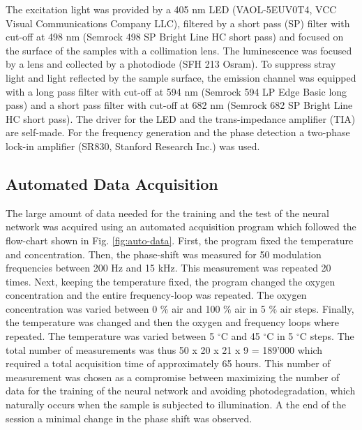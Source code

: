 \documentclass[9pt,twocolumn,twoside,pdftex]{optica}
\begin{document}
The excitation light was provided by a 405 nm LED (VAOL-5EUV0T4, VCC Visual Communications Company LLC), filtered by a short pass (SP) filter with cut-off at 498 nm (Semrock 498 SP Bright Line HC short pass) and focused on the surface of the samples with a collimation lens. The luminescence was focused by a lens and collected by a photodiode (SFH 213 Osram).
To suppress stray light and light reflected by the sample surface, the emission channel was equipped with a long pass filter with cut-off at 594 nm (Semrock 594 LP Edge Basic long pass) and a short pass filter with cut-off at 682 nm (Semrock 682 SP Bright Line HC short pass). The driver for the LED and the trans-impedance amplifier (TIA) are self-made.
For the frequency generation and the phase detection a two-phase lock-in amplifier (SR830, Stanford Research Inc.) was used. 

\subsection{Automated Data Acquisition}
\label{Data}

The large amount of data needed for the training and the test of the neural network was acquired using an automated acquisition program which followed the flow-chart shown in Fig. \ref{fig:auto-data}. First, the program fixed the temperature and concentration. Then, the phase-shift was measured for 50 modulation frequencies between 200 Hz and 15 kHz. This measurement was repeated 20 times. Next, keeping the temperature fixed, the program changed the oxygen concentration and the entire frequency-loop was repeated.
The oxygen concentration was varied between 0 $\%$ air and 100 $\%$ air in 5 $\%$ air steps.
Finally, the temperature was changed and then the oxygen and frequency loops where repeated. The temperature was varied between 5 $^\circ$C and 45 $^\circ$C in 5 $^\circ$C steps.
The total number of measurements was thus 50 x 20 x 21 x 9 = 189'000 which required a total acquisition time of approximately 65 hours. This number of measurement was chosen as a compromise between maximizing the number of data for the training of the neural network and avoiding photodegradation, which naturally occurs when the sample is subjected to illumination. A the end of the session a minimal change in the phase shift was observed.
\end{document}
